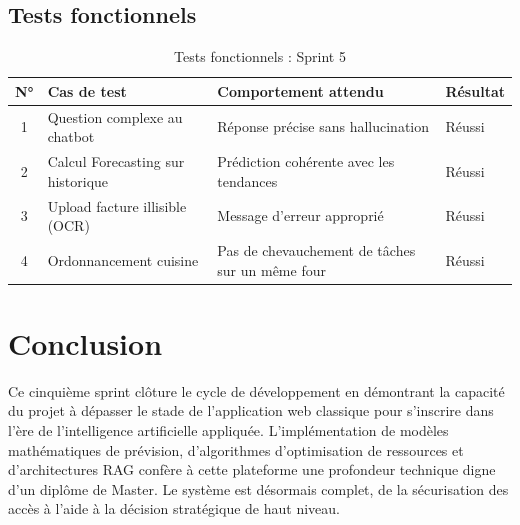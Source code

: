 \subsection{Tests fonctionnels}

\begin{table}[H]
    \centering
    \caption{Tests fonctionnels : Sprint 5}
    \label{tab:tests_sprint5}
    \renewcommand{\arraystretch}{1.3}
    \begin{tabular}{|c|p{4cm}|p{4cm}|p{2cm}|}
        \hline
        \textbf{N°} & \textbf{Cas de test} & \textbf{Comportement attendu} & \textbf{Résultat} \\
        \hline
        1 & Question complexe au chatbot & Réponse précise sans hallucination & Réussi \\
        \hline
        2 & Calcul Forecasting sur historique & Prédiction cohérente avec les tendances & Réussi \\
        \hline
        3 & Upload facture illisible (OCR) & Message d'erreur approprié & Réussi \\
        \hline
        4 & Ordonnancement cuisine & Pas de chevauchement de tâches sur un même four & Réussi \\
        \hline
    \end{tabular}
\end{table}

\section*{Conclusion}

\begin{samepage}
Ce cinquième sprint clôture le cycle de développement en démontrant la capacité du projet à dépasser le stade de l'application web classique pour s'inscrire dans l'ère de l'intelligence artificielle appliquée. L'implémentation de modèles mathématiques de prévision, d'algorithmes d'optimisation de ressources et d'architectures RAG confère à cette plateforme une profondeur technique digne d'un diplôme de Master. Le système est désormais complet, de la sécurisation des accès à l'aide à la décision stratégique de haut niveau.
\end{samepage}

